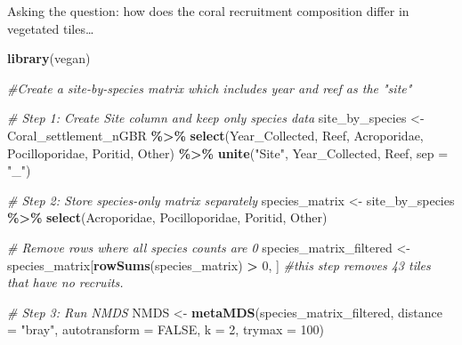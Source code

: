 \documentclass[
]{article}
\newenvironment{Shaded}{\begin{snugshade}}{\end{snugshade}}
\newcommand{\AttributeTok}[1]{\textcolor[rgb]{0.13,0.29,0.53}{#1}}
\newcommand{\CommentTok}[1]{\textcolor[rgb]{0.56,0.35,0.01}{\textit{#1}}}
\newcommand{\ConstantTok}[1]{\textcolor[rgb]{0.56,0.35,0.01}{#1}}
\newcommand{\DecValTok}[1]{\textcolor[rgb]{0.00,0.00,0.81}{#1}}
\newcommand{\FunctionTok}[1]{\textcolor[rgb]{0.13,0.29,0.53}{\textbf{#1}}}
\newcommand{\NormalTok}[1]{#1}
\newcommand{\OtherTok}[1]{\textcolor[rgb]{0.56,0.35,0.01}{#1}}
\newcommand{\SpecialCharTok}[1]{\textcolor[rgb]{0.81,0.36,0.00}{\textbf{#1}}}
\newcommand{\StringTok}[1]{\textcolor[rgb]{0.31,0.60,0.02}{#1}}
\begin{document}
Asking the question: how does the coral recruitment composition differ
in vegetated tiles\ldots{}

\begin{Shaded}
\begin{Highlighting}[]
\FunctionTok{library}\NormalTok{(vegan)}

\CommentTok{\#Create a site{-}by{-}species matrix which includes year and reef as the "site"}

\CommentTok{\# Step 1: Create Site column and keep only species data}
\NormalTok{site\_by\_species }\OtherTok{\textless{}{-}}\NormalTok{ Coral\_settlement\_nGBR }\SpecialCharTok{\%\textgreater{}\%} 
  \FunctionTok{select}\NormalTok{(Year\_Collected, Reef, Acroporidae, Pocilloporidae, Poritid, Other) }\SpecialCharTok{\%\textgreater{}\%} 
  \FunctionTok{unite}\NormalTok{(}\StringTok{"Site"}\NormalTok{, Year\_Collected, Reef, }\AttributeTok{sep =} \StringTok{"\_"}\NormalTok{)}

\CommentTok{\# Step 2: Store species{-}only matrix separately}
\NormalTok{species\_matrix }\OtherTok{\textless{}{-}}\NormalTok{ site\_by\_species }\SpecialCharTok{\%\textgreater{}\%}
  \FunctionTok{select}\NormalTok{(Acroporidae, Pocilloporidae, Poritid, Other)}

\CommentTok{\# Remove rows where all species counts are 0}
\NormalTok{species\_matrix\_filtered }\OtherTok{\textless{}{-}}\NormalTok{ species\_matrix[}\FunctionTok{rowSums}\NormalTok{(species\_matrix) }\SpecialCharTok{\textgreater{}} \DecValTok{0}\NormalTok{, ] }\CommentTok{\#this step removes 43 tiles that have no recruits.}

\CommentTok{\# Step 3: Run NMDS}
\NormalTok{NMDS }\OtherTok{\textless{}{-}} \FunctionTok{metaMDS}\NormalTok{(species\_matrix\_filtered, }\AttributeTok{distance =} \StringTok{"bray"}\NormalTok{, }\AttributeTok{autotransform =} \ConstantTok{FALSE}\NormalTok{, }\AttributeTok{k =} \DecValTok{2}\NormalTok{, }\AttributeTok{trymax =} \DecValTok{100}\NormalTok{)}
\end{Highlighting}
\end{Shaded}
\end{document}
